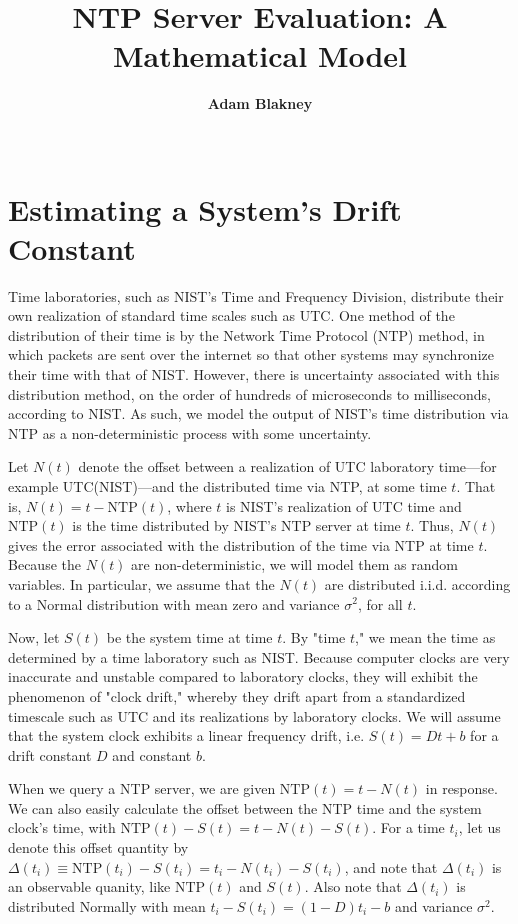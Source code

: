 \documentclass[letterpaper, 11pt]{article}
\begin{document}
     
\title{NTP Server Evaluation: A Mathematical Model}
\author{\textbf{Adam Blakney} \\ 
\\}
\maketitle
        
\section{Estimating a System's Drift Constant}

Time laboratories, such as NIST's Time and Frequency Division, distribute their own realization
of standard time scales such as UTC. One method of the distribution of their time is by the
Network Time Protocol (NTP) method, in which packets are sent over the internet so that
other systems may synchronize their time with that of NIST. However, there is uncertainty
associated with this distribution method, on the order of hundreds of microseconds to
milliseconds, according to NIST. As such, we model the output of NIST's time distribution
via NTP as a non-deterministic process with some uncertainty.

Let $N(t)$ denote the offset between a realization of UTC laboratory time---for example
UTC(NIST)---and the distributed time via NTP, at some time $t$.
That is, $N(t)  = t
- \text{NTP}(t)$, where $t$ is NIST's realization of UTC time and $\text{NTP}(t)$ is the
time distributed by NIST's NTP server at time $t$. Thus, $N(t)$ gives the error associated
with the distribution of the time via NTP at time $t$.
Because the $N(t) $ are non-deterministic, we will model them as random variables. In particular,
we assume that the $N(t)$ are distributed i.i.d. according to a Normal distribution with mean
zero and variance $\sigma^2$, for all $t$. 

Now, let $S(t)$ be the system time at time $t$. By "time $t$," we mean the time as determined
by a time laboratory such as NIST. Because computer clocks are very inaccurate
and unstable compared to laboratory clocks, they will exhibit the phenomenon of "clock drift,"
whereby they drift apart from a standardized timescale such as UTC and its realizations
by laboratory clocks. We will assume that the system clock exhibits a linear frequency drift,
i.e. $S(t) = Dt + b$ for a drift constant $D$ and constant $b$.

When we query a NTP server, we are given $\text{NTP}(t) = t - N(t)$ in response. We can also
easily calculate the offset between the NTP time and the system clock's time, with
$\text{NTP}(t) - S(t) = t - N(t) - S(t)$. For a time $t_i$, let us
denote this offset quantity by $\Delta(t_i)
\equiv \text{NTP}(t_i)-S(t_i) = t_i - N(t_i) - S(t_i) $, and note that $\Delta(t_i)$ is an
observable quanity,
like $\text{NTP}(t)$ and $S(t)$. Also note that $\Delta(t_i)$ is distributed Normally with
mean $t_i - S(t_i)  = (1-D)t_i - b$ and variance $\sigma^2$.
\end{document}
